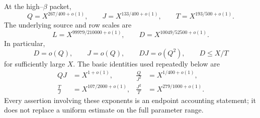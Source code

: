 At the high--\(\beta\) packet,
\begin{equation}
 Q=X^{267/400+o(1)},\qquad
 J=X^{133/400+o(1)},\qquad
 T=X^{193/500+o(1)}.
 \label{eq:tpc35-high-beta-scales}
\end{equation}
The underlying source and row scales are
\begin{equation}
 L=X^{99979/210000+o(1)},\qquad
 D=X^{10049/52500+o(1)}.
 \label{eq:tpc35-high-beta-LD}
\end{equation}
In particular,
\begin{equation}
 D=o(Q),\qquad J=o(Q),\qquad DJ=o(Q^2),\qquad D\le X/T
 \label{eq:tpc35-endpoint-consequences}
\end{equation}
for sufficiently large \(X\).
The basic identities used repeatedly below are
\begin{align}
 QJ&=X^{1+o(1)},
 &\frac{Q}{J^2}&=X^{1/400+o(1)},
 \label{eq:tpc35-basic-ledger-one}\\
 \frac{T}{J}&=X^{107/2000+o(1)},
 &\frac{J^2}{T}&=X^{279/1000+o(1)}.
 \label{eq:tpc35-basic-ledger-two}
\end{align}
Every assertion involving these exponents is an endpoint accounting
statement; it does not replace a uniform estimate on the full parameter
range.

